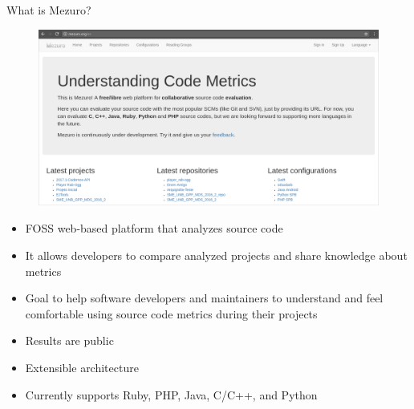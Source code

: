 \begin{block}{What is Mezuro?}
    \begin{figure}
        \begin{center}
            \includegraphics[width=\textwidth]{figures/MezuroHome.png}
            \label{fig:feature1}
        \end{center}
    \end{figure}

    \begin{itemize}
        \item FOSS web-based platform that analyzes source code

        \item It allows developers to compare analyzed projects and share
            knowledge about metrics

        \item Goal to help software developers and maintainers to understand
            and feel comfortable using source code metrics during their projects

        \item Results are public

        \item Extensible architecture

        \item Currently supports Ruby, PHP, Java, C/C++, and Python

    \end{itemize}
\end{block}
